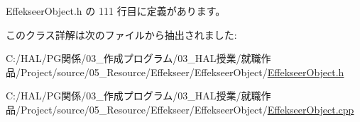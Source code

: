  Effekseer\+Object.\+h の 111 行目に定義があります。



このクラス詳解は次のファイルから抽出されました\+:\begin{DoxyCompactItemize}
\item 
C\+:/\+H\+A\+L/\+P\+G関係/03\+\_\+作成プログラム/03\+\_\+\+H\+A\+L授業/就職作品/\+Project/source/05\+\_\+\+Resource/\+Effekseer/\+Effekseer\+Object/\mbox{\hyperlink{_effekseer_object_8h}{Effekseer\+Object.\+h}}\item 
C\+:/\+H\+A\+L/\+P\+G関係/03\+\_\+作成プログラム/03\+\_\+\+H\+A\+L授業/就職作品/\+Project/source/05\+\_\+\+Resource/\+Effekseer/\+Effekseer\+Object/\mbox{\hyperlink{_effekseer_object_8cpp}{Effekseer\+Object.\+cpp}}\end{DoxyCompactItemize}
